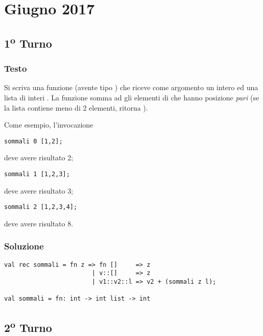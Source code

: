 \section{Giugno 2017}

\subsection{1\textsuperscript{o} Turno}

\subsubsection{Testo}

Si scriva una funzione  (avente tipo ) che riceve come argomento un intero  ed una lista di interi .
La funzione  somma ad  gli elementi di  che hanno posizione \emph{pari} (se la lista contiene meno di 2 elementi,  ritorna ).

\medskip
Come esempio, l'invocazione

\begin{lstlisting}
sommali 0 [1,2];
\end{lstlisting}

deve avere risultato 2;

\begin{lstlisting}
sommali 1 [1,2,3];
\end{lstlisting}

deve avere risultato 3;

\begin{lstlisting}
sommali 2 [1,2,3,4];
\end{lstlisting}

deve avere risultato 8.

\subsubsection{Soluzione}

\begin{lstlisting}[style = SML, caption = {[Definizione della funzione \sml{sommali} - 1\textsuperscript{o} Turno]Definizione della funzione \sml{sommali}}]
val rec sommali = fn z => fn []     => z
						| v::[]     => z
						| v1::v2::l => v2 + (sommali z l);

val sommali = fn: int -> int list -> int
\end{lstlisting}

\subsection{2\textsuperscript{o} Turno}

